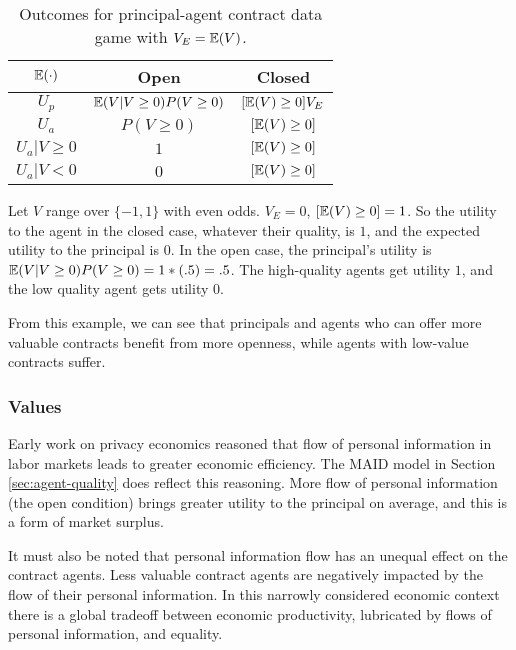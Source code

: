 \documentclass[../thesis.tex]{subfiles}
\begin{document}
\begin{table}
\begin{center}
\begin{tabular}{ |c|c|c| } 
 \hline
  $\mathbb{E}(\cdot)$ & Open & Closed \\
 \hline
 $U_p$ & $\mathbb{E}(V \vert V \geq 0) P(V \geq 0)$ & $[\mathbb{E}(V) \geq 0] V_E$  \\ 
 $U_a$ & $P(V \geq 0)$ & $[\mathbb{E}(V) \geq 0]$  \\
 $U_a \vert V \geq 0$ & $1$ & $[\mathbb{E}(V) \geq 0]$  \\
 $U_a \vert V < 0$ & $0$ & $[\mathbb{E}(V) \geq 0]$  \\
 \hline
\end{tabular}
\end{center}
\caption{Outcomes for principal-agent contract data game with $V_E = \mathbb{E}(V)$.}
\end{table} 

\begin{exm}
  Let $V$ range over $\{-1,1\}$ with even odds.
    $V_E = 0$, $[\mathbb{E}(V) \geq 0] = 1$.
    So the utility to the agent in the closed case, whatever their quality,
    is $1$, and the expected utility to the principal is $0$.
    In the open case, the principal's utility is
    $\mathbb{E}(V \vert V \geq 0) P(V \geq 0) = 1 * (.5) = .5$.
    The high-quality agents get utility $1$, and the low
    quality agent gets utility $0$.
\end{exm}

From this example, we can see that principals and agents
who can offer more valuable contracts benefit from more
openness, while agents with low-value contracts suffer.


\subsubsection{Values}

Early work on privacy economics reasoned that
flow of personal information in labor markets
leads to greater economic efficiency. \cite{posner1981economics}
The MAID model in Section \ref{sec:agent-quality}
does reflect this reasoning.
More flow of personal information (the open condition)
brings greater utility to the principal
on average, and this is a form of market surplus.

It must also be noted that personal information flow
has an unequal effect on the contract agents.
Less valuable contract agents are negatively impacted
by the flow of their personal information.
In this narrowly considered economic context there 
is a global tradeoff between economic productivity,
lubricated by flows of personal information, and
equality.
\end{document}
